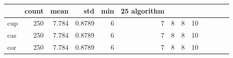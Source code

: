 \begin{tabular}{lrrrrrrrr}
\toprule
 & count & mean & std & min & 25%
algorithm &  &  &  &  &  &  &  &  \\
\midrule
cup & 250 & 7.784 & 0.8789 & 6 & 7 & 8 & 8 & 10 \\
cas & 250 & 7.784 & 0.8789 & 6 & 7 & 8 & 8 & 10 \\
cor & 250 & 7.784 & 0.8789 & 6 & 7 & 8 & 8 & 10 \\
\bottomrule
\end{tabular}
